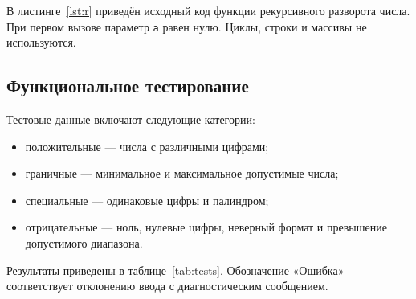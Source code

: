\documentclass[14pt,a4paper]{extarticle}
\numberwithin{equation}{section}
\numberwithin{figure}{section}
\numberwithin{table}{section}
\begin{document}
\medskip\noindent\begin{minipage}{\linewidth}
\setlength{\parindent}{1.25cm}
В листинге~\ref{lst:r} приведён исходный код функции рекурсивного разворота числа. При первом вызове параметр \texttt{a} равен нулю. Циклы, строки и массивы не используются.


\end{minipage}

\clearpage\subsection{Функциональное тестирование}
Тестовые данные включают следующие категории:
\begin{itemize}
\item положительные --- числа с различными цифрами;
\item граничные --- минимальное и максимальное допустимые числа;
\item специальные --- одинаковые цифры и палиндром;
\item отрицательные --- ноль, нулевые цифры, неверный формат и превышение допустимого диапазона.
\end{itemize}
Результаты приведены в таблице~\ref{tab:tests}. Обозначение «Ошибка» соответствует отклонению ввода с диагностическим сообщением.
\end{document}
